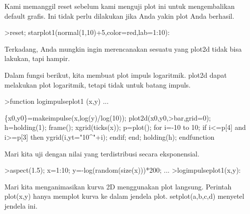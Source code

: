 \documentclass{article}
\begin{document}
\begin{eulernotebook}
\begin{eulercomment}
\begin{eulercomment}
\begin{eulercomment}
\begin{eulercomment}
\begin{eulercomment}
\begin{eulercomment}
\begin{eulercomment}
\begin{eulercomment}
\begin{eulercomment}
\begin{eulercomment}
\begin{eulercomment}
\begin{eulercomment}
\begin{eulercomment}
Kami memanggil reset sebelum kami menguji plot ini untuk mengembalikan
default grafis. Ini tidak perlu dilakukan jika Anda yakin plot Anda
berhasil.
\end{eulercomment}
\begin{eulerprompt}
>reset; starplot1(normal(1,10)+5,color=red,lab=1:10):
\end{eulerprompt}
\begin{eulercomment}
Terkadang, Anda mungkin ingin merencanakan sesuatu yang plot2d tidak
bisa lakukan, tapi hampir.

Dalam fungsi berikut, kita membuat plot impuls logaritmik. plot2d
dapat melakukan plot logaritmik, tetapi tidak untuk batang impuls.
\end{eulercomment}
\begin{eulerprompt}
>function logimpulseplot1 (x,y) ...
\end{eulerprompt}
\begin{eulerudf}
    \{x0,y0\}=makeimpulse(x,log(y)/log(10));
    plot2d(x0,y0,>bar,grid=0);
    h=holding(1);
    frame();
    xgrid(ticks(x));
    p=plot();
    for i=-10 to 10;
      if i<=p[4] and i>=p[3] then
         ygrid(i,yt="10^"+i);
      endif;
    end;
    holding(h);
  endfunction
\end{eulerudf}
\begin{eulercomment}
Mari kita uji dengan nilai yang terdistribusi secara eksponensial.
\end{eulercomment}
\begin{eulerprompt}
>aspect(1.5); x=1:10; y=-log(random(size(x)))*200; ...
>logimpulseplot1(x,y):
\end{eulerprompt}
\begin{eulercomment}
Mari kita menganimasikan kurva 2D menggunakan plot langsung. Perintah
plot(x,y) hanya memplot kurva ke dalam jendela plot. setplot(a,b,c,d)
menyetel jendela ini.


\end{eulercomment}
\end{eulercomment}
\end{eulercomment}
\end{eulercomment}
\end{eulercomment}
\end{eulercomment}
\end{eulercomment}
\end{eulercomment}
\end{eulercomment}
\end{eulercomment}
\end{eulercomment}
\end{eulercomment}
\end{eulercomment}
\end{eulernotebook}
\end{document}
